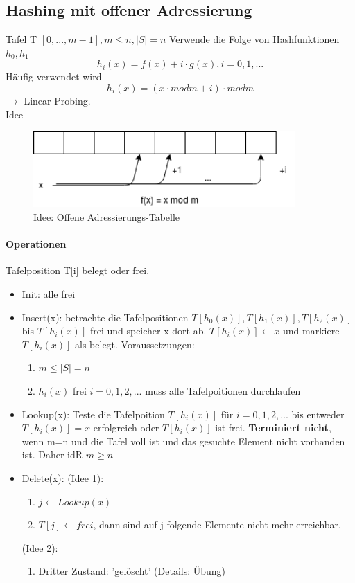 \documentclass[ngerman]{scrartcl}
\begin{document}
\subsection{Hashing mit offener Adressierung}
Tafel T $ [0, ..., m-1], m \leq n, |S| = n $
Verwende die Folge von Hashfunktionen $ h_0, h_1 $ 
$$ h_i(x) = f(x) + i \cdot g(x), i = 0,1,...$$
Häufig verwendet wird
$$ h_i(x) = (x \cdot mod m + i)\cdot mod m $$
$\rightarrow$ Linear Probing.\\
Idee
\begin{figure}[h]
    \begin{center}
        \includegraphics[width=10cm]{offeneadressierung.png}
        \caption{Idee: Offene Adressierungs-Tabelle}
        \label{fig:}
    \end{center}
\end{figure}

\paragraph{Operationen} Tafelposition T[i] belegt oder frei.
\begin{itemize}
    \item Init: alle frei
    \item Insert(x): betrachte die Tafelpositionen $T[h_0(x)], T[h_1(x)], T[h_2(x)]$ bis $ T[h_i(x)] $ frei und speicher x dort ab.
    $ T[h_i(x)] \leftarrow x $ und markiere $ T[h_i(x)]$ als belegt. Voraussetzungen:
    \begin{enumerate}
        \item $ m \leq |S| = n $
        \item $ h_i(x) $ frei $ i = 0,1,2,... $ muss alle Tafelpoitionen durchlaufen
    \end{enumerate}
    \item Lookup(x): Teste die Tafelpoition $ T[h_i(x)] $ für $ i=0,1,2,... $ bis entweder $ T[h_i(x)] = x $ erfolgreich oder $ T[h_i(x)] $ ist frei. \textbf{Terminiert nicht}, wenn m=n und die Tafel voll ist und das gesuchte Element nicht vorhanden ist. Daher idR $ m \geq n $
    \item Delete(x): (Idee 1):
    \begin{enumerate}
        \item $ j \leftarrow Lookup(x) $ 
        \item $ T[j] \leftarrow frei $, dann sind auf j folgende Elemente nicht mehr erreichbar.
    \end{enumerate}
    (Idee 2):
    \begin{enumerate}
        \item Dritter Zustand: 'gelöscht' (Details: Übung)
    \end{enumerate}
\end{itemize}
\end{document}

